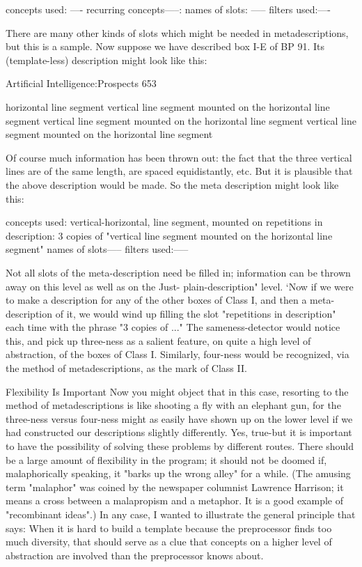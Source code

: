    concepts used: ----
   recurring concepts-----:
   names of slots: -----
   filters used:----

   There are many other kinds of slots which might be needed in metadescriptions,
   but this is a sample. Now suppose we have described box I-E of BP 91. Its
   (template-less) description might look like this:




Artificial Intelligence:Prospects                                                        653

       horizontal line segment
       vertical line segment mounted on the horizontal line segment
       vertical line segment mounted on the horizontal line segment
       vertical line segment mounted on the horizontal line segment

   Of course much information has been thrown out: the fact that the three vertical
   lines are of the same length, are spaced equidistantly, etc. But it is plausible that
   the above description would be made. So the meta description might look like this:

       concepts used: vertical-horizontal, line segment, mounted on
       repetitions in description: 3 copies of "vertical line segment mounted on the
       horizontal line segment"
       names of slots-----
       filters used:-----

   Not all slots of the meta-description need be filled in; information can be thrown
   away on this level as well as on the Just- plain-description" level.
   ‘Now if we were to make a description for any of the other boxes of Class I, and
   then a meta-description of it, we would wind up filling the slot "repetitions in
   description" each time with the phrase "3 copies of ..." The sameness-detector
   would notice this, and pick up three-ness as a salient feature, on quite a high level
   of abstraction, of the boxes of Class I. Similarly, four-ness would be recognized,
   via the method of metadescriptions, as the mark of Class II.

                               Flexibility Is Important
   Now you might object that in this case, resorting to the method of
   metadescriptions is like shooting a fly with an elephant gun, for the three-ness
   versus four-ness might as easily have shown up on the lower level if we had
   constructed our descriptions slightly differently. Yes, true-but it is important to
   have the possibility of solving these problems by different routes. There should be
   a large amount of flexibility in the program; it should not be doomed if,
   malaphorically speaking, it "barks up the wrong alley" for a while. (The amusing
   term "malaphor" was coined by the newspaper columnist Lawrence Harrison; it
   means a cross between a malapropism and a metaphor. It is a good example of
   "recombinant ideas".) In any case, I wanted to illustrate the general principle that
   says: When it is hard to build a template because the preprocessor finds too much
   diversity, that should serve as a clue that concepts on a higher level of abstraction
   are involved than the preprocessor knows about.


